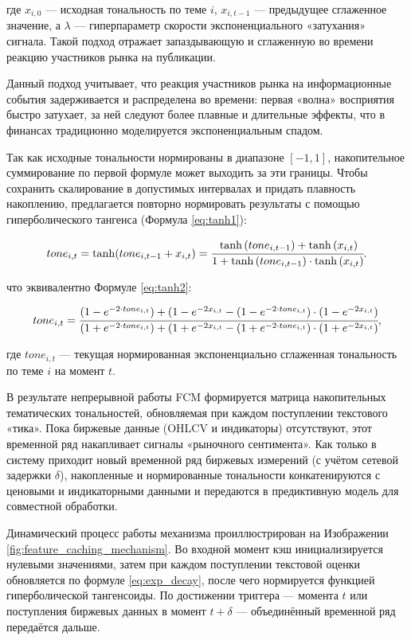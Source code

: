 где $x_{i, 0}$ --- исходная тональность по теме $i$, $x_{i,t-1}$ --- предыдущее сглаженное значение,
а $\lambda$ --- гиперпараметр скорости экспоненциального «затухания» сигнала. Такой подход отражает
запаздывающую и сглаженную во времени реакцию участников рынка на публикации.

Данный подход учитывает, что реакция участников рынка на информационные события задерживается и распределена
во времени: первая «волна» восприятия быстро затухает, за ней следуют более плавные и длительные эффекты,
что в финансах традиционно моделируется экспоненциальным спадом.

Так как исходные тональности нормированы в диапазоне $[-1,1]$, накопительное суммирование по первой формуле
может выходить за эти границы. Чтобы сохранить скалирование в допустимых интервалах и придать плавность
накоплению, предлагается повторно нормировать результаты с помощью гиперболического тангенса (Формула \ref{eq:tanh1}):

\begin{equation}\label{eq:tanh1}
    tone_{i, t} = \tanh(tone_{i, t-1} + x_{i,t}) =
    \cfrac{
        \tanh{(tone_{i, t-1})} + \tanh{(x_{i,t})}
    }{
        1 + \tanh{(tone_{i, t-1})} \cdot \tanh{(x_{i,t})}
    }.
\end{equation}

что эквивалентно Формуле \ref{eq:tanh2}:

\begin{equation}\label{eq:tanh2}
    tone_{i, t} =
    \cfrac{
        (1-e^{-2 \cdot tone_{i, t}})+(1-e^{-2x_{i,t}} - (1-e^{-2 \cdot tone_{i, t}}) \cdot(1-e^{-2x_{i,t}})
    }{
        (1+e^{-2 \cdot tone_{i, t}})+(1+e^{-2x_{i,t}} - (1+e^{-2 \cdot tone_{i, t}}) \cdot(1+e^{-2x_{i,t}})
    },
\end{equation}

где $tone_{i, t}$ --- текущая нормированная экспоненциально сглаженная тональность по теме $i$ на момент $t$.

В результате непрерывной работы FCM формируется матрица накопительных тематических тональностей,
обновляемая при каждом поступлении текстового «тика». Пока биржевые данные (OHLCV и индикаторы)
отсутствуют, этот временной ряд накапливает сигналы «рыночного сентимента». Как только в систему
приходит новый временной ряд биржевых измерений (с учётом сетевой задержки $\delta$), накопленные
и нормированные тональности конкатенируются с ценовыми и индикаторными данными и передаются
в предиктивную модель для совместной обработки.

Динамический процесс работы механизма проиллюстрирован на Изображении \ref{fig:feature_caching_mechanism}.
Во входной момент кэш инициализируется нулевыми значениями, затем при каждом поступлении текстовой оценки
обновляется по формуле \ref{eq:exp_decay}, после чего нормируется функцией гиперболической тангенсоиды. По достижении триггера ---
момента $t$ или поступления биржевых данных в момент $t+\delta$ --- объединённый временной ряд передаётся дальше.


